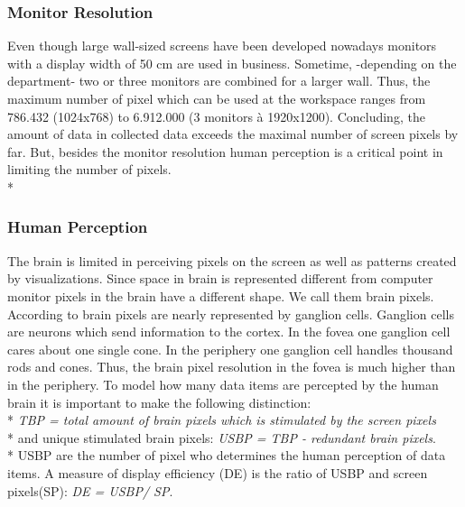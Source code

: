 \subsubsection*{Monitor Resolution}\label{resolution}
Even though large wall-sized screens have been developed nowadays monitors with a display width of 50 cm are used in business. Sometime, -depending on the department- two or three monitors are combined for a larger wall. Thus, the maximum number of pixel which can be used at the workspace ranges from 786.432 (1024x768) to 6.912.000 (3 monitors à 1920x1200).
Concluding, the amount of data in collected data exceeds the maximal number of screen pixels by far. But, besides the monitor resolution human perception is a critical point in limiting the number of pixels.
\\*
\subsubsection*{Human Perception} \label{perception}
The brain is limited in perceiving pixels on the screen as well as patterns created by visualizations. Since space in brain is represented different from computer monitor pixels in the brain have a different shape. We call them brain pixels. According to \cite{Ware2012a} brain pixels are nearly represented by ganglion cells. Ganglion cells are neurons which send information to the cortex. In the fovea one ganglion cell cares about one single cone. In the periphery one ganglion cell handles thousand rods and cones. Thus, the brain pixel resolution in the fovea is much higher than in the periphery. 
To model how many data items are percepted by the human brain it is important to make the following distinction: 
\\*
\textit{TBP = total amount of brain pixels which is stimulated by the screen pixels}\\*
and unique stimulated brain pixels: \textit{USBP = TBP - redundant brain pixels}.\\*
USBP are the number of pixel who determines the human perception of data items. A measure of display efficiency (DE) is the ratio of USBP and screen pixels(SP): \textit{DE = USBP/ SP}.

